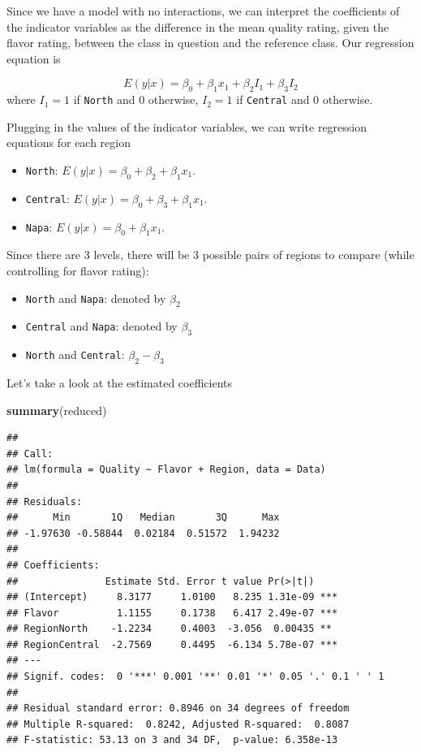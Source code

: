 \documentclass[
]{book}
\newenvironment{Shaded}{\begin{snugshade}}{\end{snugshade}}
\newcommand{\FunctionTok}[1]{\textcolor[rgb]{0.13,0.29,0.53}{\textbf{#1}}}
\newcommand{\NormalTok}[1]{#1}
\providecommand{\tightlist}{%
  \setlength{\itemsep}{0pt}\setlength{\parskip}{0pt}}
\begin{document}
Since we have a model with no interactions, we can interpret the coefficients of the indicator variables as the difference in the mean quality rating, given the flavor rating, between the class in question and the reference class. Our regression equation is

\[
E(y|x) = \beta_0 + \beta_1 x_1 + \beta_2 I_1 + \beta_3 I_2
\]
where \(I_1 = 1\) if \texttt{North} and 0 otherwise, \(I_2 = 1\) if \texttt{Central} and 0 otherwise.

Plugging in the values of the indicator variables, we can write regression equations for each region

\begin{itemize}
\tightlist
\item
  \texttt{North}: \(E(y|x) = \beta_0 + \beta_ 2 + \beta_1 x_1\).
\item
  \texttt{Central}: \(E(y|x) = \beta_0 + \beta_ 3 + \beta_1 x_1\).
\item
  \texttt{Napa}: \(E(y|x) = \beta_0 + \beta_1 x_1\).
\end{itemize}

Since there are 3 levels, there will be 3 possible pairs of regions to compare (while controlling for flavor rating):

\begin{itemize}
\tightlist
\item
  \texttt{North} and \texttt{Napa}: denoted by \(\beta_ 2\)
\item
  \texttt{Central} and \texttt{Napa}: denoted by \(\beta_ 3\)
\item
  \texttt{North} and \texttt{Central}: \(\beta_2 - \beta_3\)
\end{itemize}

Let's take a look at the estimated coefficients

\begin{Shaded}
\begin{Highlighting}[]
\FunctionTok{summary}\NormalTok{(reduced)}
\end{Highlighting}
\end{Shaded}

\begin{verbatim}
## 
## Call:
## lm(formula = Quality ~ Flavor + Region, data = Data)
## 
## Residuals:
##      Min       1Q   Median       3Q      Max 
## -1.97630 -0.58844  0.02184  0.51572  1.94232 
## 
## Coefficients:
##               Estimate Std. Error t value Pr(>|t|)    
## (Intercept)     8.3177     1.0100   8.235 1.31e-09 ***
## Flavor          1.1155     0.1738   6.417 2.49e-07 ***
## RegionNorth    -1.2234     0.4003  -3.056  0.00435 ** 
## RegionCentral  -2.7569     0.4495  -6.134 5.78e-07 ***
## ---
## Signif. codes:  0 '***' 0.001 '**' 0.01 '*' 0.05 '.' 0.1 ' ' 1
## 
## Residual standard error: 0.8946 on 34 degrees of freedom
## Multiple R-squared:  0.8242, Adjusted R-squared:  0.8087 
## F-statistic: 53.13 on 3 and 34 DF,  p-value: 6.358e-13
\end{verbatim}
\end{document}
